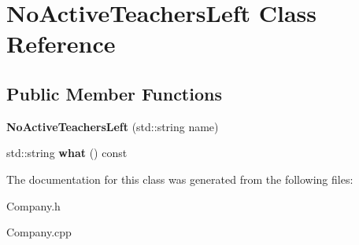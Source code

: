 \hypertarget{class_no_active_teachers_left}{}\section{No\+Active\+Teachers\+Left Class Reference}
\label{class_no_active_teachers_left}
\subsection*{Public Member Functions}
\begin{DoxyCompactItemize}
\item 
\mbox{\label{class_no_active_teachers_left_aad05df1f29604757084eb13bbabbfe9e}} 
{\bfseries No\+Active\+Teachers\+Left} (std\+::string name)
\item 
\mbox{\label{class_no_active_teachers_left_a2760ee32e2c9e4d7dc6e2844a947eaaa}} 
std\+::string {\bfseries what} () const
\end{DoxyCompactItemize}


The documentation for this class was generated from the following files\+:\begin{DoxyCompactItemize}
\item 
Company.\+h\item 
Company.\+cpp\end{DoxyCompactItemize}
